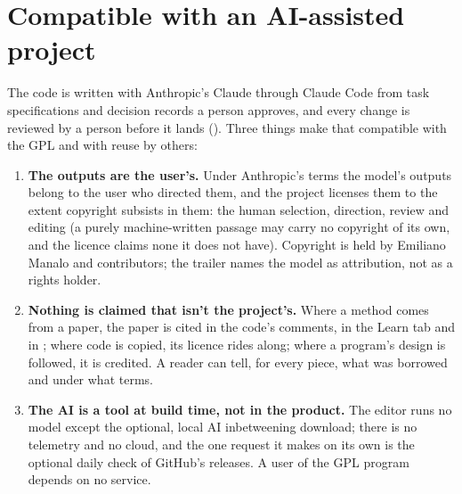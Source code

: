 \section{Compatible with an AI-assisted project}
The code is written with Anthropic's Claude through Claude Code \cite{ClaudeCode2026} from task specifications and
decision records a person approves, and every change is reviewed by a person before it lands
(). Three things make that compatible with the GPL and with reuse by others:
\begin{enumerate}
  \item \textbf{The outputs are the user's.} Under Anthropic's terms \cite{AnthropicTerms2026} the model's outputs belong
    to the user who directed them, and the project licenses them to the extent copyright subsists in them: the human
    selection, direction, review and editing (a purely machine-written passage may carry no copyright of its own, and
    the licence claims none it does not have). Copyright is held by Emiliano Manalo and contributors; the
     trailer names the model as attribution, not as a rights holder.
  \item \textbf{Nothing is claimed that isn't the project's.} Where a method comes from a paper, the paper is cited in
    the code's comments, in the Learn tab and in ; where code is copied, its licence rides
    along; where a program's design is followed, it is credited. A reader can tell, for every piece, what was borrowed
    and under what terms.
  \item \textbf{The AI is a tool at build time, not in the product.} The editor runs no model except the optional,
    local AI inbetweening download; there is no telemetry and no cloud, and the one request it makes on its own is the
    optional daily check of GitHub's releases. A user of the GPL program depends on no service.
\end{enumerate}

